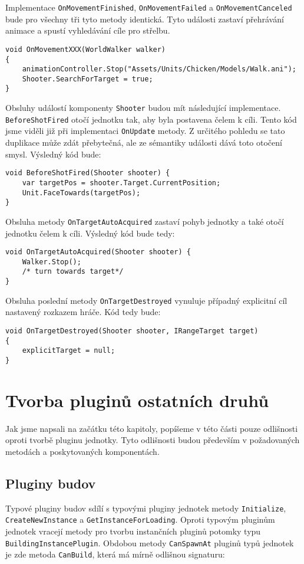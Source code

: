 Implementace \texttt{OnMovementFinished}, \texttt{OnMovementFailed} a \texttt{OnMovementCanceled} bude pro všechny tři tyto metody identická. Tyto události zastaví přehrávání animace a spustí vyhledávání cíle pro střelbu.
\begin{lstlisting}
void OnMovementXXX(WorldWalker walker)
{
	animationController.Stop("Assets/Units/Chicken/Models/Walk.ani");
	Shooter.SearchForTarget = true;
}
\end{lstlisting}

Obsluhy událostí komponenty \texttt{Shooter} budou mít následující implementace. \texttt{BeforeShotFired} otočí jednotku tak, aby byla postavena čelem k cíli. Tento kód jsme viděli již při implementaci \texttt{OnUpdate} metody. Z určitého pohledu se tato duplikace může zdát přebytečná, ale ze sémantiky události dává toto otočení smysl. Výsledný kód bude:
\begin{lstlisting}
void BeforeShotFired(Shooter shooter) {
	var targetPos = shooter.Target.CurrentPosition;
	Unit.FaceTowards(targetPos);
}
\end{lstlisting}

Obsluha metody \texttt{OnTargetAutoAcquired} zastaví pohyb jednotky a také otočí jednotku čelem k cíli. Výsledný kód bude tedy:
\begin{lstlisting}
void OnTargetAutoAcquired(Shooter shooter) {
	Walker.Stop();
	/* turn towards target*/
}
\end{lstlisting}

Obsluha poslední metody \texttt{OnTargetDestroyed} vynuluje případný explicitní cíl nastavený rozkazem hráče. Kód tedy bude:
\begin{lstlisting}
void OnTargetDestroyed(Shooter shooter, IRangeTarget target)
{
	explicitTarget = null;	
}
\end{lstlisting}

\section{Tvorba pluginů ostatních druhů}
Jak jsme napsali na začátku této kapitoly, popíšeme v této části pouze odlišnosti oproti tvorbě pluginu jednotky. Tyto odlišnosti budou především v požadovaných metodách a poskytovaných komponentách.  

\subsection{Pluginy budov}
Typové pluginy budov sdílí s typovými pluginy jednotek metody \texttt{Initialize}, \texttt{CreateNewInstance} a \texttt{GetInstanceForLoading}. Oproti typovým pluginům jednotek vracejí metody pro tvorbu instančních pluginů potomky typu \texttt{BuildingInstancePlugin}. Obdobou metody \texttt{CanSpawnAt} pluginů typů jednotek je zde metoda \texttt{CanBuild}, která má mírně odlišnou signaturu:

